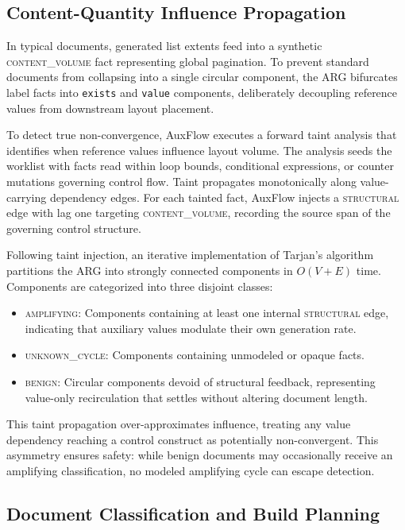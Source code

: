 \documentclass[conference]{IEEEtran}
\newcommand{\cls}[1]{\textsc{#1}}
\begin{document}
\subsection{Content-Quantity Influence Propagation}

In typical documents, generated list extents feed into a synthetic \cls{content\_volume} fact representing global pagination. To prevent standard documents from collapsing into a single circular component, the ARG bifurcates label facts into \texttt{exists} and \texttt{value} components, deliberately decoupling reference values from downstream layout placement.

To detect true non-convergence, AuxFlow executes a forward taint analysis that identifies when reference values influence layout volume. The analysis seeds the worklist with facts read within loop bounds, conditional expressions, or counter mutations governing control flow. Taint propagates monotonically along value-carrying dependency edges. For each tainted fact, AuxFlow injects a \cls{structural} edge with lag one targeting \cls{content\_volume}, recording the source span of the governing control structure.

Following taint injection, an iterative implementation of Tarjan's algorithm partitions the ARG into strongly connected components in $O(V+E)$ time. Components are categorized into three disjoint classes:
\begin{itemize}
\item \cls{amplifying}: Components containing at least one internal \cls{structural} edge, indicating that auxiliary values modulate their own generation rate.
\item \cls{unknown\_cycle}: Components containing unmodeled or opaque facts.
\item \cls{benign}: Circular components devoid of structural feedback, representing value-only recirculation that settles without altering document length.
\end{itemize}
This taint propagation over-approximates influence, treating any value dependency reaching a control construct as potentially non-convergent. This asymmetry ensures safety: while benign documents may occasionally receive an amplifying classification, no modeled amplifying cycle can escape detection.

\subsection{Document Classification and Build Planning}
\end{document}
